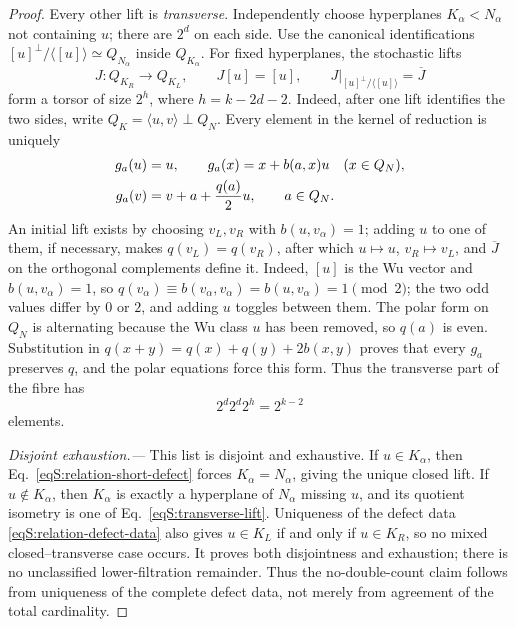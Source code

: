\documentclass[journal,twocolumn]{IEEEtran}
\theoremstyle{definition}
\theoremstyle{plain}
\begin{document}
\begin{proof}
Every other lift is \emph{transverse}.  Independently choose hyperplanes
$K_\alpha<N_\alpha$ not containing $u$; there are $2^d$ on each side.
Use the canonical identifications
$[u]^\perp/\langle[u]\rangle\simeq Q_{N_\alpha}$ inside
$Q_{K_\alpha}$.  For fixed hyperplanes, the stochastic lifts
\begin{equation}
 J:Q_{K_R}\longrightarrow Q_{K_L},\qquad
 J[u]=[u],\qquad
 J|_{[u]^\perp/\langle[u]\rangle}=\overline J
 \label{eqS:transverse-lift}
\end{equation}
form a torsor of size $2^h$, where $h=k-2d-2$.  Indeed, after one lift
identifies the two sides, write
$Q_K=\langle u,v\rangle\perp Q_N$.  Every element in the kernel of
reduction is uniquely
\begin{align}
 g_a(u)&=u,\qquad
 g_a(x)=x+b(a,x)u\quad(x\in Q_N),\notag\\
 g_a(v)&=v+a+\frac{q(a)}2u,\qquad a\in Q_N.
 \label{eqS:shortening-unipotent}
\end{align}
An initial lift exists by choosing $v_L,v_R$ with $b(u,v_\alpha)=1$;
adding $u$ to one of them, if necessary, makes
$q(v_L)=q(v_R)$, after which
$u\mapsto u$, $v_R\mapsto v_L$, and $\overline J$ on the orthogonal
complements define it.  Indeed, $[u]$ is the Wu vector and
$b(u,v_\alpha)=1$, so
$q(v_\alpha)\equiv b(v_\alpha,v_\alpha)=b(u,v_\alpha)=1\pmod2$;
the two odd values differ by $0$ or $2$, and adding $u$ toggles between
them.  The polar form on $Q_N$ is alternating because the
Wu class $u$ has been removed, so $q(a)$ is even.  Substitution in
$q(x+y)=q(x)+q(y)+2b(x,y)$ proves that every $g_a$ preserves $q$, and the
polar equations force this form.  Thus the transverse part of the fibre has
\begin{equation}
 2^d2^d2^h=2^{k-2}
 \label{eqS:shortening-fiber-count}
\end{equation}
elements.

\smallskip\noindent\emph{Disjoint exhaustion.---}
This list is disjoint and exhaustive.  If $u\in K_\alpha$, then
Eq.~\eqref{eqS:relation-short-defect} forces $K_\alpha=N_\alpha$, giving
the unique closed lift.  If $u\notin K_\alpha$, then $K_\alpha$ is exactly
a hyperplane of $N_\alpha$ missing $u$, and its quotient isometry is one of
Eq.~\eqref{eqS:transverse-lift}.  Uniqueness of the defect data
\eqref{eqS:relation-defect-data} also gives
$u\in K_L$ if and only if $u\in K_R$, so no mixed closed--transverse case
occurs.  It proves both disjointness and exhaustion;
there is no unclassified lower-filtration remainder.  Thus the no-double-count
claim follows from uniqueness of the complete defect data, not merely from
agreement of the total cardinality.


\end{proof}
\end{document}
